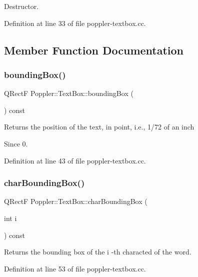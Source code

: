 Destructor. 

Definition at line 33 of file poppler-\/textbox.\+cc.



\subsection{Member Function Documentation}
\mbox{\label{class_poppler_1_1_text_box_aec5e4bb53dc611ab6ee5d7e23f7fc428}} 
\subsubsection{\texorpdfstring{bounding\+Box()}{boundingBox()}}
{\footnotesize\ttfamily Q\+RectF Poppler\+::\+Text\+Box\+::bounding\+Box (\begin{DoxyParamCaption}{ }\end{DoxyParamCaption}) const}

Returns the position of the text, in point, i.\+e., 1/72 of an inch

\begin{DoxySince}{Since}
0. 
\end{DoxySince}


Definition at line 43 of file poppler-\/textbox.\+cc.

\mbox{\label{class_poppler_1_1_text_box_aebaf1758240244c08d75dba3d0229f83}} 
\subsubsection{\texorpdfstring{char\+Bounding\+Box()}{charBoundingBox()}}
{\footnotesize\ttfamily Q\+RectF Poppler\+::\+Text\+Box\+::char\+Bounding\+Box (\begin{DoxyParamCaption}\item[{int}]{i }\end{DoxyParamCaption}) const}

Returns the bounding box of the {\ttfamily i} -\/th characted of the word. 

Definition at line 53 of file poppler-\/textbox.\+cc.

